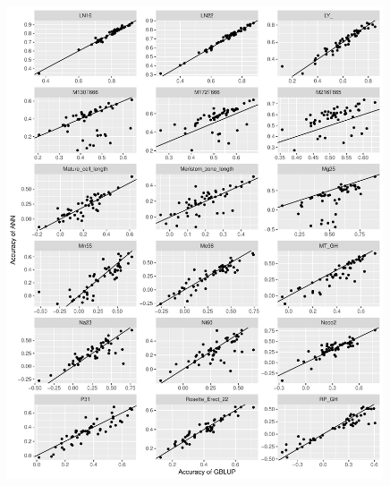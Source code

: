 \begin{figure}[H]
  \centering \includegraphics[height=0.99\textheight, width=0.99\textwidth]{Figures/cor_plots_5}
  \decoRule
 \label{fig:bla}
\end{figure}

